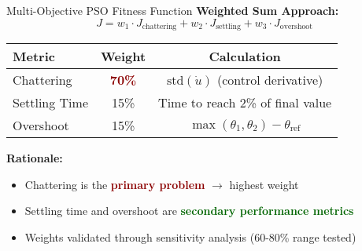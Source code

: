 \documentclass[10pt,aspectratio=169]{beamer}
\newcommand{\emphred}[1]{\textcolor{darkred}{\textbf{#1}}}
\newcommand{\emphgreen}[1]{\textcolor{darkgreen}{\textbf{#1}}}
\begin{document}
\begin{frame}{Multi-Objective PSO Fitness Function}
\textbf{Weighted Sum Approach:}
\[
J = w_1 \cdot J_{\text{chattering}} + w_2 \cdot J_{\text{settling}} + w_3 \cdot J_{\text{overshoot}}
\]

\vspace{0.3cm}
\begin{table}
\centering
\begin{tabular}{lcc}
\toprule
\textbf{Metric} & \textbf{Weight} & \textbf{Calculation} \\
\midrule
Chattering & \emphred{70\%} & $\text{std}(\dot{u})$ (control derivative) \\
Settling Time & 15\% & Time to reach 2\% of final value \\
Overshoot & 15\% & $\max(\theta_1, \theta_2) - \theta_{\text{ref}}$ \\
\bottomrule
\end{tabular}
\end{table}

\vspace{0.3cm}
\textbf{Rationale:}
\begin{itemize}
    \item Chattering is the \emphred{primary problem} $\rightarrow$ highest weight
    \item Settling time and overshoot are \emphgreen{secondary performance metrics}
    \item Weights validated through sensitivity analysis (60-80\% range tested)
\end{itemize}
\end{frame}
\end{document}
